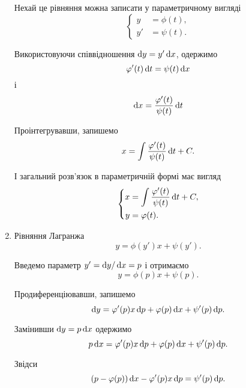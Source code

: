 \begin{enumerate}
	Нехай це рівняння можна записати у параметричному вигляді
	\begin{equation*}
		\left\{
			\begin{aligned}
				y &= \phi(t), \\
				y' &= \psi(t).
			\end{aligned}
		\right.
	\end{equation*}
	
	Використовуючи співвідношення $\mathop{}\!\mathrm{d} y = y ' \mathop{}\!\mathrm{d} x$, одержимо 
	\begin{equation*}
		\varphi'(t) \mathop{}\!\mathrm{d} t = \psi(t) \mathop{}\!\mathrm{d} x
	\end{equation*}
	і
	\begin{equation*}
		\mathop{}\!\mathrm{d} x = \frac{\varphi'(t)}{\psi(t)} \mathop{}\!\mathrm{d} t
	\end{equation*}
	
	Проінтегрувавши, запишемо
	\begin{equation*}
		x = \int \frac{\varphi'(t)}{\psi(t)} \mathop{}\!\mathrm{d} t + C.
	\end{equation*}
	
	І загальний розв'язок в параметричній формі має вигляд
	\begin{equation*}
		\left\{
			\begin{aligned}
				x &= \int \frac{\varphi'(t)}{\psi(t)} \mathop{}\!\mathrm{d} t + C, \\
				y &= \varphi(t).
			\end{aligned}
		\right.
	\end{equation*}
	
	\item Рівняння Лагранжа
	\begin{equation*}
		y = \phi(y') x + \psi(y').
	\end{equation*}
	
	Введемо параметр $y' = \mathop{}\!\mathrm{d} y / \mathop{}\!\mathrm{d} x = p$ і отримаємо
	\begin{equation*}
		y = \phi(p) x + \psi(p).
	\end{equation*}
	
	Продиференціювавши, запишемо
	\begin{equation*}
		\mathop{}\!\mathrm{d} y = \varphi'(p) x \mathop{}\!\mathrm{d} p + \varphi(p) \mathop{}\!\mathrm{d} x + \psi'(p) \mathop{}\!\mathrm{d} p.
	\end{equation*}
	
	Замінивши $\mathop{}\!\mathrm{d} y = p \mathop{}\!\mathrm{d} x$ одержимо
	\begin{equation*}
		p \mathop{}\!\mathrm{d} x = \varphi'(p) x \mathop{}\!\mathrm{d} p + \varphi(p) \mathop{}\!\mathrm{d} x + \psi'(p) \mathop{}\!\mathrm{d} p.
	\end{equation*}
	
	Звідси
	\begin{equation*}
		(p - \varphi(p)) \mathop{}\!\mathrm{d} x - \varphi'(p) x \mathop{}\!\mathrm{d} p = \psi'(p) \mathop{}\!\mathrm{d} p.
	\end{equation*}
	

\end{enumerate}
